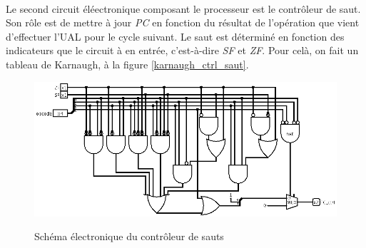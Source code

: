 \paragraph{}{
	Le second circuit éléectronique composant le processeur est
	le contrôleur de saut. Son rôle est de mettre à jour \textit{PC}
	en fonction du résultat de l'opération que vient d'effectuer
	l'UAL pour le cycle suivant. Le saut est déterminé en fonction
	des indicateurs que le circuit à en entrée, c'est-à-dire 
	\textit{SF} et \textit{ZF}. Pour celà, on fait un tableau de
	Karnaugh, à la figure \ref{karnaugh_ctrl_saut}.
}

\begin{figure}
	\centering
	\includegraphics[scale=0.4,origin=c]{circuits/control_saut.png}
	\label{control_saut_circ}
	\caption{Sch\'{e}ma \'{e}lectronique du contr\^{o}leur de sauts}
\end{figure}

